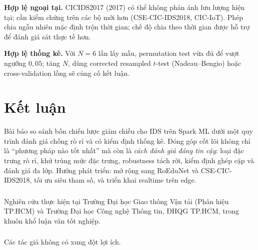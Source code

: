 \documentclass[runningheads]{llncs}
\begin{document}
\textbf{Hợp lệ ngoại tại.} CICIDS2017 (2017) có thể không phản ánh lưu lượng hiện tại; cần kiểm chứng trên các bộ mới hơn (CSE-CIC-IDS2018, CIC-IoT). Phép chia ngẫu nhiên mặc định trộn thời gian; chế độ chia theo thời gian được hỗ trợ để đánh giá sát thực tế hơn.

\textbf{Hợp lệ thống kê.} Với $N{=}6$ lần lấy mẫu, permutation test vừa đủ để vượt ngưỡng $0{,}05$; tăng $N$, dùng corrected resampled $t$-test (Nadeau--Bengio) hoặc cross-validation lồng sẽ củng cố kết luận.

\section{Kết luận}
\label{sec:conclude}

Bài báo so sánh bốn chiến lược giảm chiều cho IDS trên Spark ML dưới một quy trình đánh giá chống rò rỉ và có kiểm định thống kê. Đóng góp cốt lõi không chỉ là ``phương pháp nào tốt nhất'' mà còn là \emph{cách đánh giá đáng tin cậy}: loại đặc trưng rò rỉ, khử trùng mức đặc trưng, robustness tách rời, kiểm định ghép cặp và đánh giá đa lớp. Hướng phát triển: mở rộng sang RoEduNet và CSE-CIC-IDS2018, tối ưu siêu tham số, và triển khai realtime trên edge.

\begin{credits}
\subsubsection{\ackname} Nghiên cứu thực hiện tại Trường Đại học Giao thông Vận tải (Phân hiệu TP.HCM) và Trường Đại học Công nghệ Thông tin, ĐHQG TP.HCM, trong khuôn khổ luận văn tốt nghiệp.
\subsubsection{\discintname} Các tác giả không có xung đột lợi ích.
\end{credits}



\end{document}
